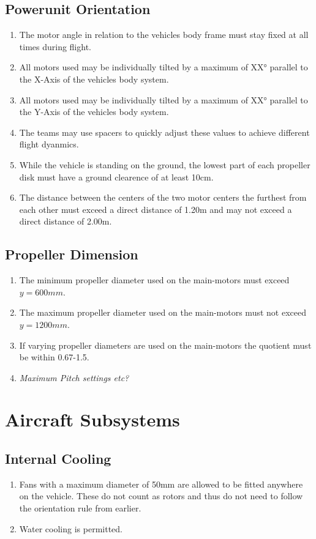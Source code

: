 \documentclass{article}
\begin{document}
\subsection{Powerunit Orientation}
\begin{enumerate}
  \item The motor angle in relation to the vehicles body frame must stay fixed at all times during flight. 
  \item All motors used may be individually tilted by a maximum of XX° parallel to the X-Axis of the vehicles body system.
  \item All motors used may be individually tilted by a maximum of XX° parallel to the Y-Axis of the vehicles body system.
  \item The teams may use spacers to quickly adjust these values to achieve different flight dyanmics.
  \item While the vehicle is standing on the ground, the lowest part of each propeller disk must have a ground clearence of at least 10cm. 
  \item The distance between the centers of the two motor centers the furthest from each other must exceed a direct distance of 1.20m and may not exceed a direct distance of 2.00m. 
\end{enumerate}


\subsection{Propeller Dimension}
\begin{enumerate}
  \item The minimum propeller diameter used on the main-motors must exceed $y=600mm$.
  \item The maximum propeller diameter used on the main-motors must not exceed $y=1200mm$.
  \item If varying propeller diameters are used on the main-motors the quotient must be within 0.67-1.5.
  \item \emph{Maximum Pitch settings etc?}
\end{enumerate}





\section{Aircraft Subsystems}

\subsection{Internal Cooling}
\begin{enumerate}
  \item Fans with a maximum diameter of 50mm are allowed to be fitted anywhere on the vehicle. These do not count as rotors and thus do not need to follow the orientation rule from earlier.
  \item Water cooling is permitted. 
\end{enumerate}
\end{document}
